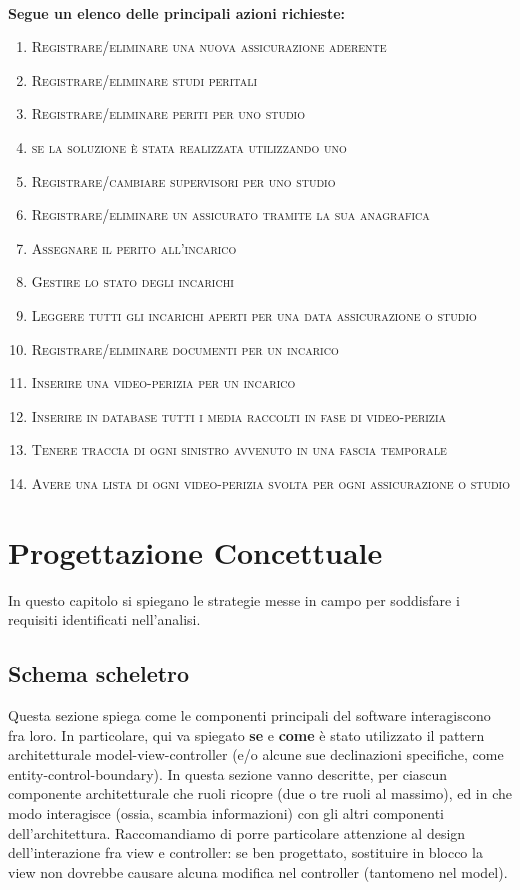\documentclass[a4paper,12pt]{report}
\begin{document}
\\
\textbf{Segue un elenco delle principali azioni richieste:}
\begin{enumerate}
    \item \textsc{Registrare/eliminare una nuova assicurazione aderente}
    \item \textsc{Registrare/eliminare studi peritali}
    \item \textsc{Registrare/eliminare periti per uno studio}
    \item \textsc{se la soluzione è stata realizzata utilizzando uno}
    \item \textsc{Registrare/cambiare supervisori per uno studio}
    \item \textsc{Registrare/eliminare un assicurato tramite la sua anagrafica}
    \item \textsc{Assegnare il perito all'incarico}
    \item \textsc{Gestire lo stato degli incarichi}
    \item \textsc{Leggere tutti gli incarichi aperti per una data assicurazione o studio}
    \item \textsc{Registrare/eliminare documenti per un incarico}
    \item \textsc{Inserire una video-perizia per un incarico}
    \item \textsc{Inserire in database tutti i media raccolti in fase di video-perizia}
    \item \textsc{Tenere traccia di ogni sinistro avvenuto in una fascia temporale}
    \item \textsc{Avere una lista di ogni video-perizia svolta per ogni assicurazione o studio}
\end{enumerate}


\chapter{Progettazione Concettuale}

In questo capitolo si spiegano le strategie messe in campo per soddisfare i requisiti identificati nell'analisi.


\section{Schema scheletro}

Questa sezione spiega come le componenti principali del software interagiscono fra loro.
%
In particolare, qui va spiegato \textbf{se} e \textbf{come} è stato utilizzato il pattern
architetturale model-view-controller (e/o alcune sue declinazioni specifiche, come entity-control-boundary).
In questa sezione vanno descritte, per ciascun componente architetturale che ruoli ricopre (due o tre ruoli al massimo), ed in che modo interagisce (ossia, scambia informazioni) con gli altri componenti dell'architettura.
%
Raccomandiamo di porre particolare attenzione al design dell'interazione fra view e controller: se ben progettato, sostituire in blocco la view non dovrebbe causare alcuna modifica nel controller (tantomeno nel model).
\end{document}

